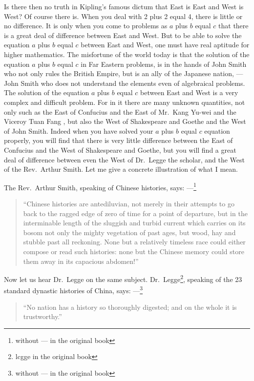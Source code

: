 Is there then no truth in Kipling's  famous dictum that East is East and West is West?
Of course there is.
When you deal with 2 plus 2 equal 4, there is little or no difference.
It is only when you come to problems as $a$ plus $b$ equal $c$ that there is a great deal of difference between East and West.
But to be able to solve the equation $a$ plus $b$ equal $c$ between East and West, one must have real aptitude for higher mathematics.
The misfortune of the world today is that the solution of the equation $a$ plus $b$ equal $c$ in Far Eastern problems, is in the hands of John Smith who not only rules the British Empire, but is an ally of the Japanese nation, --- John Smith who does not understand the elements even of algebraical problems.
The solution of the equation $a$ plus $b$ equal $c$ between East and West is a very complex and difficult problem.
For in it there are many unknown quantities, not only such as the East of Confucius and the East of Mr.~Kang Yu-wei  and the Viceroy Tuan Fang , but also the West of Shakespeare and Goethe and the West of John Smith.
Indeed when you have solved your $a$ plus $b$ equal $c$ equation properly, you will find that there is very little difference between the East of Confucius and the West of Shakespeare and Goethe, but you will find a great deal of difference between even the West of Dr.~Legge  the scholar, and the West of the Rev.~Arthur Smith.
Let me give a concrete illustration of what I mean.

The Rev.~Arthur Smith, speaking of Chinese histories, says: ---\footnote{without --- in the original book}
\begin{quote} \footnotesize
``Chinese histories are antediluvian, not merely in their attempts to go back to the ragged edge of zero of time for a point of departure, but in the interminable length of the sluggish and turbid current which carries on its bosom not only the mighty vegetation of past ages, but wood, hay and stubble past all reckoning. None but a relatively timeless race could either compose or read such histories: none but the Chinese memory could store them away in its capacious abdomen!''
\end{quote}

Now let us hear Dr.~Legge on the same subject.
Dr.~Legge\footnote{lcgge in the original book}, speaking of the 23 standard dynastic histories of China, says: ---\footnote{without --- in the original book}
\begin{quote} \footnotesize
``No nation has a history so thoroughly digested; and on the whole it is trustworthy.''
\end{quote}

